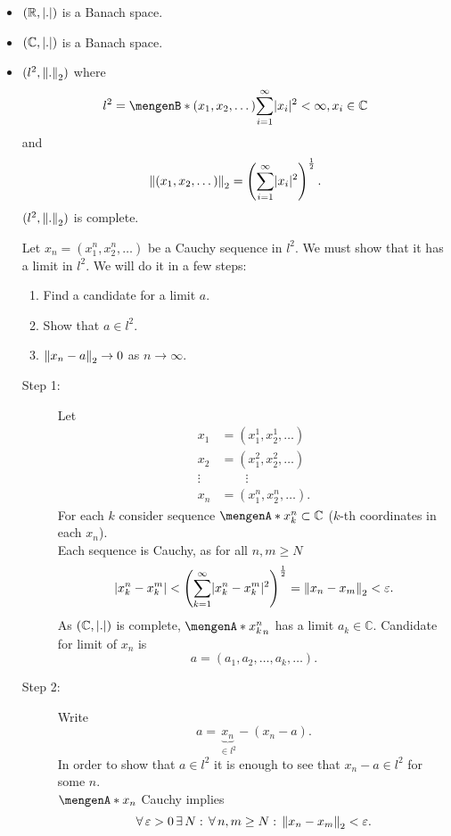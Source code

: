\begin{beispiele}
	\begin{itemize}
		\item $(\mathbb{R},\lvert.\rvert)$ is a Banach space.
		\item $(\mathbb{C},\lvert.\rvert)$ is a Banach space.
		\item $(l^2,\norm{.}_2)$ where
		\[
			l^2= \set[(x_1,x_2,\dots)]{\sum^{\infty}_{i=1} \abs{x_i}^2 < \infty, x_i \in \mathbb{C}}
		\]
		and 
		\[
			\norm{(x_1,x_2,\dots)}_2 = \left( \sum_{i=1}^{\infty} \abs{x_i}^2 \right)^{\frac{1}{2}}.
		\]
		$(l^2,\norm{.}_2)$ is complete.
		\begin{beweis}
			Let $x_n = (x_1^n,x_2^n,\dots)$ be a Cauchy sequence in $l^2$. We must show that it has a limit in $l^2$. We will do it in a few steps:
			\begin{enumerate}[Step 1:]
				\item Find a candidate for a limit $a$.
				\item Show that $a \in l^2$.
				\item $\norm{x_n - a }_2 \to 0$ as $n \to \infty$.
			\end{enumerate}
			\begin{description}
				\item[Step 1:] Let
				\begin{align*}
					x_1 &= (x_1^1,x_2^1, \dots) \\
					x_2 &= (x_1^2,x_2^2, \dots) \\
					\vdots & \qquad \vdots \\
					x_n &= (x_1^n,x_2^n, \dots).
				\end{align*}
				For each $k$ consider sequence $\set{x_k^n} \subset \mathbb{C}$ ($k$-th coordinates in each $x_n$). \\
				Each sequence is Cauchy, as for all $n,m \geq N$
				\[
					\abs{x_k^n-x_k^m} < \left( \sum_{k=1}^{\infty} \abs{x_k^n-x_k^m}^2 \right)^{\frac{1}{2}} = \norm{x_n-x_m}_2 < \varepsilon.
				\]
				As $(\mathbb{C}, \lvert.\rvert)$ is complete, $\set{x_k^n}_n$ has a limit $a_k \in \mathbb{C}$. Candidate for limit of $x_n$ is 
				\[
					a= (a_1,a_2, \dots, a_k, \dots).
				\]
				\item[Step 2:] Write 
				\[
					a = \underset{\in l^2}{\underbrace{x_n}} - (x_n - a).
				\]
				In order to show that $a \in l^2$ it is enough to see that $x_n - a \in l^2$ for some $n$. \\
				$\set{x_n}$ Cauchy implies
				\[
					\forall\, \varepsilon>0 \,\exists\,N: \,\forall\, n,m \geq N: \,\norm{x_n-x_m}_2 < \varepsilon.
\]
\end{description}
\end{beweis}
\end{itemize}
\end{beispiele}
